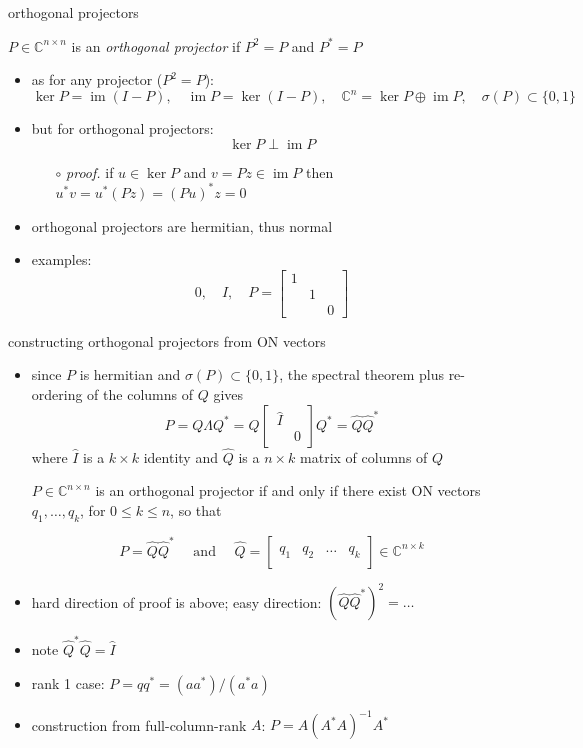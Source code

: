 \documentclass[10pt,hyperref]{beamer}
\newcommand{\CC}{\mathbb{C}}
\newcommand{\image}{\operatorname{im}}
\newcommand{\trefmatrixthree}[3]{\left[\begin{array}{c|c|c|c} & & & \\ #1 & #2 & \dots & #3 \\ & & & \end{array}\right]}
\begin{document}
\begin{frame}{orthogonal projectors}

\begin{definition}
$P \in \CC^{n\times n}$ is an \emph{orthogonal projector} if $P^2=P$ and $P^*=P$
\end{definition}

\begin{itemize}
\item as for any projector ($P^2=P$):
    $$\ker P = \image (I-P), \quad \image P = \ker (I-P), \quad \CC^n = \ker P \oplus \image P, \quad \sigma(P) \subset \{0,1\}$$
\item but for orthogonal projectors:
    $$\ker P \perp \image P$$

    \begin{itemize}
    \item[$\circ$] \emph{proof.}  if $u\in\ker P$ and $v=Pz\in\image P$ then $u^*v = u^*(Pz)=(Pu)^*z = 0$
    \end{itemize}
\item orthogonal projectors are hermitian, thus normal
\item examples:
    $$0, \quad I, \quad P = \begin{bmatrix} 1 & & \\ & 1 & \\ & & 0 \end{bmatrix}$$
\end{itemize}
\end{frame}


\begin{frame}{constructing orthogonal projectors from ON vectors}

\begin{itemize}
\item since $P$ is hermitian and $\sigma(P) \subset \{0,1\}$, the spectral theorem plus re-ordering of the columns of $Q$ gives
    $$P=Q \Lambda Q^* = Q \begin{bmatrix} \,\hat I & \\ & 0 \end{bmatrix} Q^* = \hat Q \hat Q^*$$
where $\hat I$ is a $k\times k$ identity and $\hat Q$ is a $n\times k$ matrix of columns of $Q$

\begin{lemma}  $P\in \CC^{n\times n}$ is an orthogonal projector if and only if there exist ON vectors $q_1,\dots,q_k$, for $0 \le k \le n$, so that

\vspace{-3mm}
    $$P = \hat Q \hat Q^* \quad \text{ and } \quad \hat Q = \trefmatrixthree{q_1}{q_2}{q_k} \in \CC^{n\times k}$$
\end{lemma}
\item hard direction of proof is above; easy direction: $(\hat Q\hat Q^*)^2 = \dots$
\item note $\hat Q^* \hat Q = \hat I$
\item rank 1 case: \quad $P=q q^* = (aa^*)/(a^*a)$
\item construction from full-column-rank $A$: \quad $P = A (A^* A)^{-1} A^*$
\end{itemize}
\end{frame}
\end{document}
